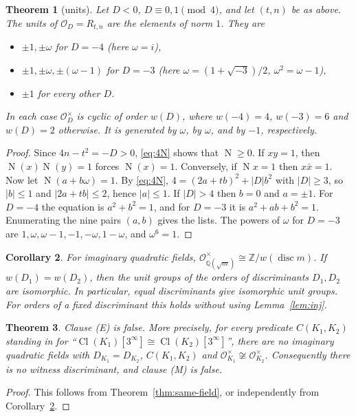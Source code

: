 \documentclass[11pt]{article}
\newtheorem{theorem}{Theorem}
\newtheorem{corollary}[theorem]{Corollary}
\theoremstyle{definition}
\theoremstyle{remark}
\newcommand{\Q}{\mathbb{Q}}
\newcommand{\Z}{\mathbb{Z}}
\newcommand{\OO}{\mathcal{O}}
\newcommand{\disc}{\operatorname{disc}}
\newcommand{\Nm}{\operatorname{N}}
\newcommand{\Cl}{\operatorname{Cl}}
\begin{document}
\begin{theorem}[units]\label{thm:units}
Let $D<0$, $D\equiv0,1\pmod4$, and let $(t,n)$ be as above. The units of $\OO_D=R_{t,n}$ are the
elements of norm $1$. They are
\begin{itemize}
\item $\pm1,\pm\omega$ for $D=-4$ (here $\omega=i$),
\item $\pm1,\pm\omega,\pm(\omega-1)$ for $D=-3$ (here $\omega=(1+\sqrt{-3})/2$, $\omega^2=\omega-1$),
\item $\pm1$ for every other $D$.
\end{itemize}
In each case $\OO_D^\times$ is cyclic of order $w(D)$, where $w(-4)=4$, $w(-3)=6$ and $w(D)=2$
otherwise. It is generated by $\omega$, by $\omega$, and by $-1$, respectively.
\end{theorem}
\begin{proof}
Since $4n-t^2=-D>0$, \eqref{eq:4N} shows that $\Nm\ge0$. If $xy=1$, then
$\Nm(x)\Nm(y)=1$ forces $\Nm(x)=1$. Conversely, if $\Nm x=1$ then $x\bar x=1$. Now let
$\Nm(a+b\omega)=1$. By \eqref{eq:4N}, $4=(2a+tb)^2+|D|b^2$ with $|D|\ge3$, so $|b|\le1$ and
$|2a+tb|\le2$, hence $|a|\le1$. If $|D|>4$ then $b=0$ and $a=\pm1$. For $D=-4$ the equation is
$a^2+b^2=1$, and for $D=-3$ it is $a^2+ab+b^2=1$. Enumerating the nine pairs $(a,b)$ gives the
lists. The powers of $\omega$ for $D=-3$ are
$1,\omega,\omega-1,-1,-\omega,1-\omega$, and $\omega^6=1$.
\end{proof}

\begin{corollary}\label{cor:w}
For imaginary quadratic fields, $\OO_{\Q(\sqrt m)}^\times\cong\Z/w(\disc m)$. If $w(D_1)=w(D_2)$,
then the unit groups of the orders of discriminants $D_1,D_2$ are isomorphic. In particular,
equal discriminants give isomorphic unit groups. For orders of a fixed discriminant this holds
without using Lemma~\ref{lem:inj}.
\end{corollary}

\begin{theorem}\label{thm:main}
Clause (E) is false. More precisely, for every predicate $C(K_1,K_2)$ standing in for
``$\Cl(K_1)[3^\infty]\cong\Cl(K_2)[3^\infty]$'', there are no imaginary quadratic fields with
$D_{K_1}=D_{K_2}$, $C(K_1,K_2)$ and $\OO_{K_1}^\times\not\cong\OO_{K_2}^\times$. Consequently
there is no witness discriminant, and clause (M) is false.
\end{theorem}
\begin{proof}
This follows from Theorem~\ref{thm:same-field}, or independently from Corollary~\ref{cor:w}.
\end{proof}
\end{document}
